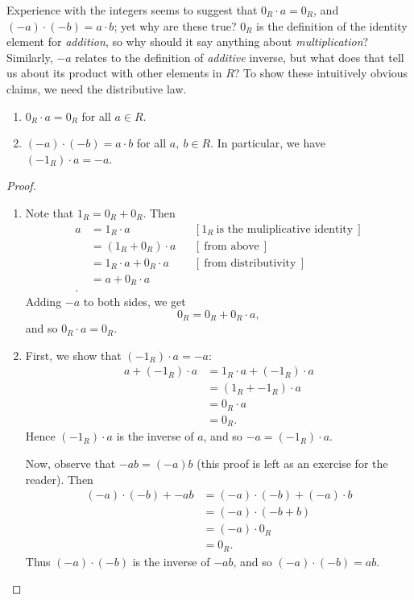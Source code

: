 \documentclass[math1530-lecture-notes]{subfiles}
\begin{document}
Experience with the integers seems to suggest that $0_R\cdot a=0_R$, and $(-a)\cdot (-b)=a\cdot b$;
yet why are these true? $0_R$ is the definition of the identity element for \textit{addition}, so
why should it say anything about \textit{multiplication}? Similarly, $-a$ relates to the definition
of \textit{additive} inverse, but what does that tell us about its product with other elements in
$R$? To show these intuitively obvious claims, we need the distributive law.

\begin{proposition}[]{}
  \begin{enumerate}
    \item $0_R\cdot a=0_R$ for all $a\in R$.
    \item $(-a)\cdot (-b)=a\cdot b$ for all $a,\ b\in R$. In particular, we have $(-1_R)\cdot a=-a$.
  \end{enumerate}
\end{proposition}
\begin{proof}[Proof]
  \begin{enumerate}
    \item Note that $1_R=0_R+0_R$. Then
      \begin{align*}
        a &= 1_R\cdot a && [1_R~\text{is the muliplicative identity}~]\\
          &= (1_R+0_R)\cdot a &&[~\text{from above}~]\\
          &= 1_R\cdot a+0_R\cdot a && [~\text{from distributivity}~] \\
          &= a+0_R\cdot a \\
      .\end{align*}
      Adding $-a$ to both sides, we get \[
        0_R = 0_R + 0_R\cdot a
      ,\] and so $0_R \cdot a=0_R$.

    \item First, we show that $(-1_R)\cdot a=-a$:
      \begin{align*}
        a + (-1_R)\cdot a&= 1_R\cdot a+(-1_R)\cdot a \\
                         &= (1_R+ -1_R)\cdot a \\
                         &= 0_R\cdot a \\
                         &= 0_R
       .\end{align*}
       Hence $(-1_R)\cdot a$ is the inverse of $a$, and so $-a=(-1_R)\cdot a$.

       Now, observe that $-ab = (-a)b$ (this proof is left as an exercise for the reader). Then
       \begin{align*}
         (-a)\cdot (-b) + -ab &= (-a)\cdot (-b) + (-a)\cdot b \\
                              &= (-a)\cdot (-b+b) \\
                              &= (-a)\cdot 0_R \\
                              &= 0_R
      .\end{align*}
      Thus $(-a)\cdot (-b)$ is the inverse of $-ab$, and so $(-a)\cdot (-b)=ab$.
  \end{enumerate}
\end{proof}
\end{document}
